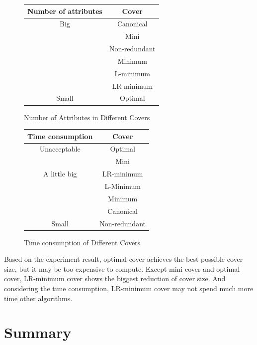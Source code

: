 \documentclass[11pt]{book}
\begin{document}
\begin{figure}[H]
	\begin{minipage}[b]{.45\linewidth}
		\centering	
		\begin{tabular}{ |c|c| }
			\hline
			Number of attributes & Cover \\
			\hline
			Big                  & Canonical \\
		                    	 & Mini      \\
		                	     & Non-redundant \\
		            	         & Minimum \\
		        	             & L-minimum \\
		    	                 & LR-minimum \\
			Small                & Optimal \\
			\hline
		\end{tabular}
		\caption{Number of Attributes in Different Covers}
	\end{minipage}
	\hfill
	\begin{minipage}[b]{.45\linewidth}
		\centering	
		\begin{tabular}{ |c|c| }
			\hline
			Time consumption & Cover \\
			\hline
			Unacceptable    & Optimal \\
		                 	& Mini      \\
		    A little big	& LR-minimum \\
		            	     & L-Minimum \\
		        	         & Minimum \\
		    	             & Canonical \\
			Small            & Non-redundant \\
			\hline
		\end{tabular}
		\caption{Time consumption of Different Covers}
	\end{minipage}	
\end{figure}

Based on the experiment result, optimal cover achieves the best possible cover size, but it may be too expensive to compute. Except mini cover and optimal cover, LR-minimum cover shows the biggest reduction of cover size. And considering the time consumption, LR-minimum cover may not spend much more time other algorithms.

\section{Summary}
\end{document}
